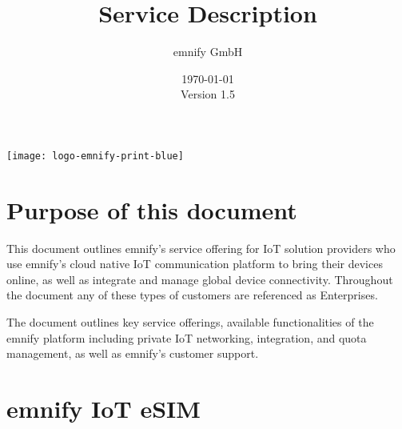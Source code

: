 \documentclass[11pt, oneside]{article}   	%
\newcommand{\addspace}{\vspace{2mm}}
\begin{document}
\title{Service Description}
\author{emnify GmbH}
\date{\today \\ \addspace Version 1.5}
\maketitle

\begin{center}
  \texttt{[image: logo-emnify-print-blue]}
\end{center}

\pagebreak[4]

\tableofcontents

\pagebreak[4]

\section{Purpose of this document}

\begin{markdown}

This document outlines emnify's service offering for IoT solution providers who use emnify's cloud native IoT communication platform to bring their devices online, as well as integrate and manage global device connectivity.
Throughout the document any of these types of customers are referenced as Enterprises. 

The document outlines key service offerings, available functionalities of the emnify platform including private IoT networking, integration, and quota management, as well as emnify's customer support.  

\end{markdown}

\section{emnify IoT eSIM}
\end{document}
